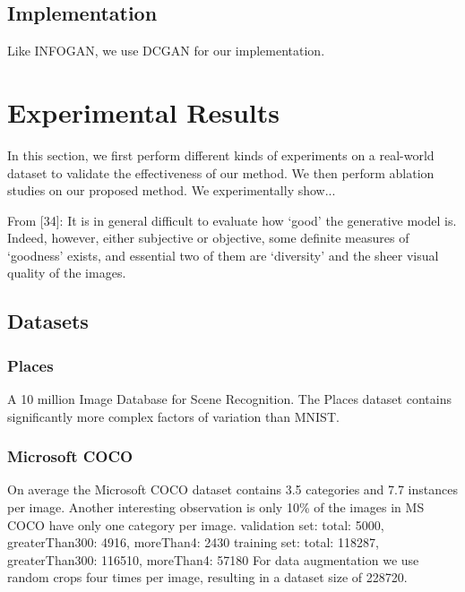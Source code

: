 \documentclass[11pt,a4paper]{article}
\begin{document}
\subsection{Implementation}
Like INFOGAN, we use DCGAN for our implementation.

\section{Experimental Results}
In this section, we first perform different kinds of experiments on a real-world dataset to validate the
effectiveness of our method. We then perform ablation studies on our proposed
method. 
We experimentally show...

From [34]: It is in general difficult to evaluate how ‘good’ the generative model is. Indeed, however, either subjective or objective, some definite measures of ‘goodness’ exists, and essential two of them are ‘diversity’ and the sheer visual quality of the images.
    
\subsection{Datasets}
\subsubsection{Places}
A 10 million Image Database for Scene Recognition. The Places dataset contains significantly more complex factors of variation than MNIST.

\subsubsection{Microsoft COCO}
On average the Microsoft COCO dataset \cite{1405.0312} contains 3.5 categories and 7.7 instances per image. Another interesting observation is only 10\% of the images in MS COCO have only one category per image.
validation set: total: 5000, greaterThan300: 4916, moreThan4: 2430
training set: total: 118287, greaterThan300: 116510, moreThan4: 57180
For data augmentation we use random crops four times per image, resulting in a dataset size of 228720.
    
\end{document}

